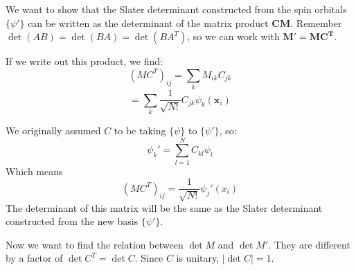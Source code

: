 \documentclass[a4paper,10pt, twocolumn, pre]{revtex4}
\newcommand{\xvec}{\mathbf{x}}
\newcommand{\mb}{\mathbf}
\begin{document}
\begin{appendices}
We want to show that the Slater determinant constructed from the spin orbitals $\{\psi'\}$ can be written as the determinant of the matrix product $\mb{C}\mb{M}$. Remember $\det(AB) = \det(BA) = \det(BA^T)$, so we can work with $\mb{M}'=\mb{M}\mb{C^T}$.

If we write out this product, we find:
\begin{equation}
	(MC^T)_{ij} = \sum_{k} M_{ik} C_{jk}
\end{equation}
\begin{equation}
	= \sum_{k}\frac{1}{\sqrt{N!}}C_{jk}\psi_k(\xvec_i)
\end{equation}

We originally assumed $C$ to be taking $\{ \psi\}$ to $\{\psi'\}$, so:
\begin{equation}
	\psi_k' = \sum_{l=1}^N C_{kl} \psi_l
	\label{eq:basis_change}
\end{equation}
Which means
\begin{equation}
(MC^T)_{ij} = \frac{1}{\sqrt{N!}} \psi_j'(x_i)
\end{equation}
The determinant of this matrix will be the same as the Slater determinant constructed from the new basis $\{\psi'\}$.

Now we want to find the relation between $\det{M}$ and $\det{M'}$. They are different by a factor of $\det{C^T} = \det{C}$. Since $C$ is unitary, $|\det C| = 1$.
\end{appendices}



\end{document}
